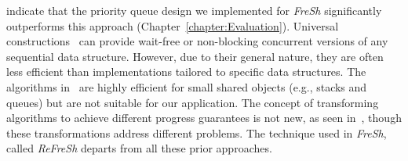 indicate that the priority queue design we implemented for \textit{FreSh} significantly
outperforms this approach (Chapter~\ref{chapter:Evaluation}).
% 
Universal constructions~\cite{FK11spaa, FK12ppopp, FK14, FK17opodis, FK09, FK20,
FKK18, EF+16, FKK22} can provide wait-free or non-blocking concurrent versions of any
sequential data structure. However, due to their general nature, they are often less
efficient than implementations tailored to specific data structures. The algorithms
in~\cite{FK11spaa, FK14, FKK22} are highly efficient for small shared objects
(e.g., stacks and queues) but are not suitable for our application.
% 
The concept of transforming algorithms to achieve different progress guarantees is not
new, as seen in~\cite{SP14, ELM05, GKK06}, though these transformations address different
problems. The technique used in \textit{FreSh}, called \textit{ReFreSh}  departs from all these
prior approaches.